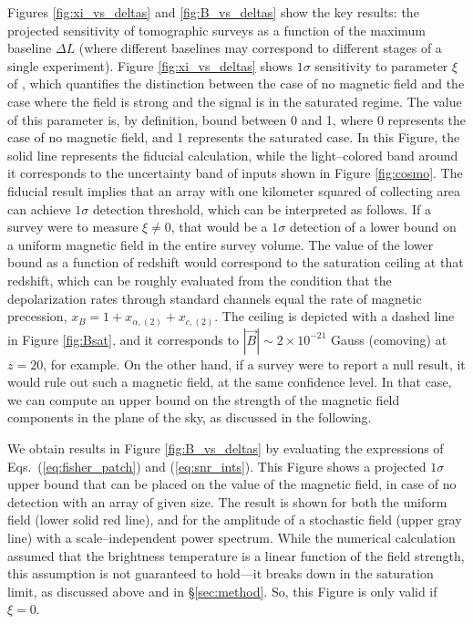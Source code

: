 Figures \ref{fig:xi_vs_deltas} and \ref{fig:B_vs_deltas} show the key results: the projected sensitivity of tomographic surveys as a function of the maximum baseline $\Delta L$ (where different baselines may correspond to different stages of a single experiment). Figure \ref{fig:xi_vs_deltas} shows $1\sigma$ sensitivity to parameter $\xi$ of \eq{\ref{eq:saturated_P}}, which quantifies the distinction between the case of no magnetic field and the case where the field is strong and the signal is in the saturated regime. The value of this parameter is, by definition, bound between 0 and 1, where 0 represents the case of no magnetic field, and 1 represents the saturated case. In this Figure, the solid line represents the fiducial calculation, while the light--colored band around it corresponds to the uncertainty band of inputs shown in Figure \ref{fig:cosmo}. The fiducial result implies that an array with one kilometer squared of collecting area can achieve $1\sigma$ detection threshold, which can be interpreted as follows. If a survey were to measure $\xi\ne 0$, that would be a $1\sigma$ detection of a lower bound on a uniform magnetic field in the entire survey volume. The value of the lower bound as a function of redshift would correspond to the saturation ceiling at that redshift, which can be roughly evaluated from the condition that the depolarization rates through standard channels equal the rate of magnetic precession, $x_B = 1+x_{\alpha ,(2)} +x_{c,(2)}$. The ceiling is depicted with a dashed line in Figure \ref{fig:Bsat}, and it corresponds to $|\vec B|\sim 2\times 10^{-21}$ Gauss (comoving) at $z=20$, for example.  On the other hand, if a survey were to report a null result, it would rule out such a magnetic field, at the same confidence level. In that case, we can compute an upper bound on the strength of the magnetic field components in the plane of the sky, as discussed in the following. 

We obtain results in Figure \ref{fig:B_vs_deltas} by evaluating the expressions of Eqs.~(\ref{eq:fisher_patch}) and (\ref{eq:snr_ints}). This Figure shows a projected $1\sigma$ upper bound that can be placed on the value of the magnetic field, in case of no detection with an array of given size. The result is shown for both the uniform field (lower solid red line), and for the amplitude of a stochastic field (upper gray line) with a scale--independent power spectrum. While the numerical calculation assumed that the brightness temperature is a linear function of the field strength, this assumption is not guaranteed to hold---it breaks down in the saturation limit, as discussed above and in \S\ref{sec:method}. So, this Figure is only valid if $\xi=0$.


